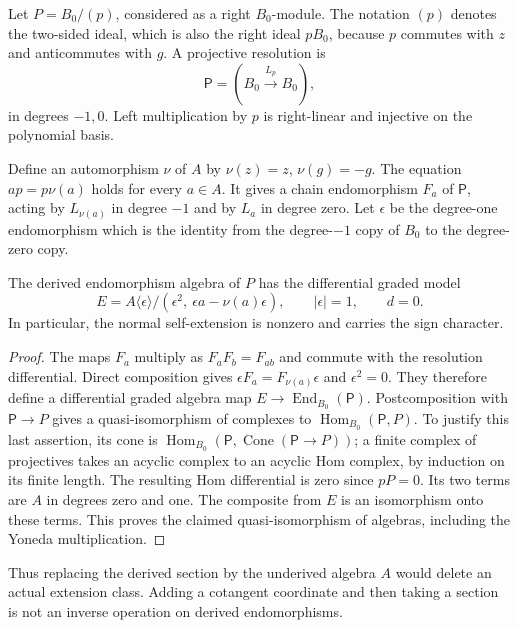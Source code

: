 Let \(P=B_0/(p)\), considered as a right \(B_0\)-module. The notation
\((p)\) denotes the two-sided ideal, which is also the right ideal
\(pB_0\), because \(p\) commutes with \(z\) and anticommutes with \(g\).
A projective resolution is
\begin{equation}\label{eq:cs-section-resolution}
 \mathsf P=(B_0\xrightarrow{L_p}B_0),
\end{equation}
in degrees \(-1,0\). Left multiplication by \(p\) is right-linear
and injective on the polynomial basis.

Define an automorphism \(\nu\) of \(A\) by \(\nu(z)=z\),
\(\nu(g)=-g\). The equation \(ap=p\nu(a)\) holds for every \(a\in A\).
It gives a chain endomorphism \(F_a\) of \(\mathsf P\), acting by
\(L_{\nu(a)}\) in degree \(-1\) and by \(L_a\) in degree zero.
Let \(\epsilon\) be the degree-one endomorphism which is the identity
from the degree-\(-1\) copy of \(B_0\) to the degree-zero copy.

\begin{proposition}\label{prop:cs-normal-extension}
The derived endomorphism algebra of \(P\) has the differential graded
model
\[
 E=A\langle\epsilon\rangle/
       (\epsilon^2,\ \epsilon a-\nu(a)\epsilon),\qquad
 |\epsilon|=1,\qquad d=0.
\]
In particular, the normal self-extension is nonzero and carries the
sign character.
\end{proposition}
\begin{proof}
The maps \(F_a\) multiply as \(F_aF_b=F_{ab}\) and commute with
the resolution differential. Direct composition gives
\(\epsilon F_a=F_{\nu(a)}\epsilon\) and \(\epsilon^2=0\).
They therefore define a differential graded algebra map
\(E\to\operatorname{End}_{B_0}(\mathsf P)\).
Postcomposition with \(\mathsf P\to P\) gives a quasi-isomorphism of
complexes to \(\operatorname{Hom}_{B_0}(\mathsf P,P)\).
To justify this last assertion, its cone is
\(\operatorname{Hom}_{B_0}(\mathsf P,\operatorname{Cone}(\mathsf P\to P))\);
a finite complex of projectives takes an acyclic complex to an acyclic
Hom complex, by induction on its finite length.
The resulting Hom differential is zero since \(pP=0\).
Its two terms are \(A\) in degrees zero and one. The composite from
\(E\) is an isomorphism onto these terms. This proves the claimed
quasi-isomorphism of algebras, including the Yoneda multiplication.
\end{proof}

Thus replacing the derived section by the underived algebra \(A\)
would delete an actual extension class. Adding a cotangent coordinate
and then taking a section is not an inverse operation on derived
endomorphisms.

